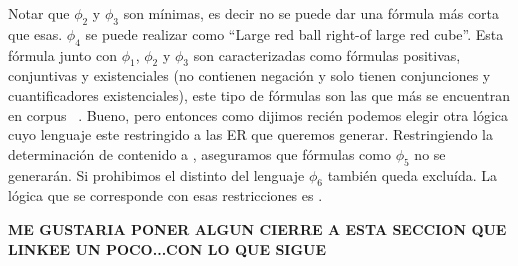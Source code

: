 Notar que $\phi_2$ y $\phi_3$ son m\'inimas, es decir no se puede dar una f\'ormula m\'as corta que esas.
$\phi_4$ se puede realizar como ``Large red ball right-of large red cube''. Esta f\'ormula junto con $\phi_1$, $\phi_2$ y $\phi_3$ son caracterizadas como f\'ormulas positivas, conjuntivas y existenciales (no contienen negaci\'on y solo tienen conjunciones y cuantificadores existenciales), este tipo de f\'ormulas son las que m\'as se encuentran en corpus ~\cite{viethen06:_algor_for_gener_refer_expres,deemter06:_build_seman_trans_corpus_for,gre3d3}. Bueno, pero entonces como dijimos reci\'en podemos elegir otra l\'ogica cuyo lenguaje este restringido a las ER que queremos generar. Restringiendo la determinaci\'on de contenido a \EPFOL, aseguramos que f\'ormulas como  $\phi_5$ no se generar\'an. Si prohibimos el distinto del lenguaje $\phi_6$ tambi\'en queda exclu\'ida. La l\'ogica que se corresponde con esas restricciones es \EL. 

\textbf{ME GUSTARIA PONER ALGUN CIERRE A ESTA SECCION QUE LINKEE UN POCO...CON LO QUE SIGUE}



%
%
%
%
%
%




